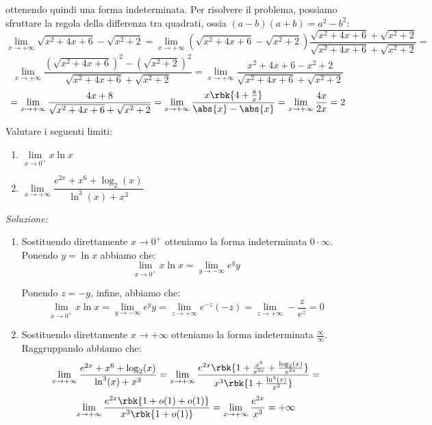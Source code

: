 \documentclass[a4paper, 12pt]{report}
\begin{document}
\begin{enumerate}
        ottenendo quindi una forma indeterminata. Per risolvere il problema, possiamo sfruttare la regola della differenza tra quadrati, ossia $(a-b)(a+b) = a^2-b^2$:
        \[\lim\limits_{x \to +\infty} \sqrt{x^2 + 4x+6} - \sqrt{x^2 +2} = \lim\limits_{x \to +\infty} (\sqrt{x^2 + 4x+6} - \sqrt{x^2 +2}) \frac{\sqrt{x^2 + 4x+6} + \sqrt{x^2 +2}}{\sqrt{x^2 + 4x+6} + \sqrt{x^2 +2}} =\]
        \[\lim\limits_{x \to +\infty} \frac{(\sqrt{x^2 + 4x+6})^2 - (\sqrt{x^2 +2})^2}{\sqrt{x^2 + 4x+6} + \sqrt{x^2 +2}} = \lim\limits_{x \to +\infty} \frac{x^2 + 4x+6 - x^2 +2}{\sqrt{x^2 + 4x+6} + \sqrt{x^2 +2}}\]
        \[= \lim\limits_{x \to +\infty} \frac{4x+8}{\sqrt{x^2 + 4x+6} + \sqrt{x^2 +2}} = \lim\limits_{x \to +\infty} \frac{x\rbk{4+\frac{8}{x}}}{\abs{x} - \abs{x}} = \lim\limits_{x \to +\infty} \frac{4x}{2x} = 2\]
    \end{enumerate}

    \begin{framedprob}{}
        Valutare i seguenti limiti:
        \begin{enumerate}
            \item $\lim\limits_{x \to 0^+} x \ln x$
            \item $\lim\limits_{x \to +\infty} \dfrac{e^{2x} + x^6 + \log_2(x)}{\ln^3(x)+x^3}$
        \end{enumerate}
    \end{framedprob}

    \textit{Soluzione:}

    \begin{enumerate}
        \item Sostituendo direttamente $x \to 0^+$ otteniamo la forma indeterminata $0 \cdot \infty$. Ponendo $y = \ln x$ abbiamo che:
        \[\lim\limits_{x \to 0^+} x \ln x = \lim_{y \to -\infty} e^y y\]

        Ponendo $z = -y$, infine, abbiamo che:
        \[\lim\limits_{x \to 0^+} x \ln x = \lim_{y \to -\infty} e^y y = \lim_{z \to +\infty} e^{-z} (-z) = \lim_{z \to +\infty} -\frac{z}{e^z} = 0\]

        \item Sostituendo direttamente $x \to +\infty$ otteniamo la forma indeterminata $\frac{\infty}{\infty}$. Raggruppando abbiamo che:
        \[\lim\limits_{x \to +\infty} \frac{e^{2x} + x^6 + \log_2(x)}{\ln^3(x)+x^3} = \lim\limits_{x \to +\infty} \frac{e^{2x} \rbk{1+ \frac{x^6}{e^{2x}} + \frac{\log_2(x)}{e^{2x}}}}{x^3\rbk{1+\frac{\ln^3(x)}{x^3}}} = \]
        \[\lim\limits_{x \to +\infty} \frac{e^{2x} \rbk{1+ o(1) + o(1)}}{x^3\rbk{1+o(1)}} = \lim\limits_{x \to +\infty} \frac{e^{2x}}{x^3} = +\infty\]

    \end{enumerate}
\end{document}
